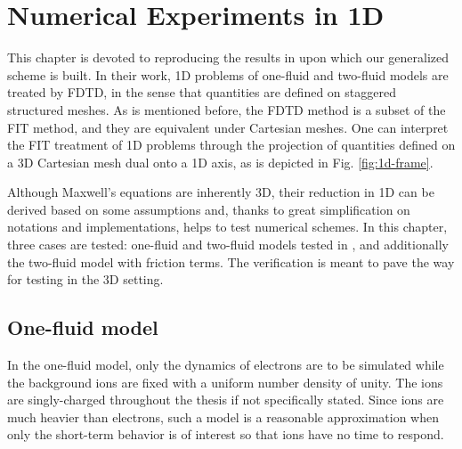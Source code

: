\documentclass{report}
\begin{document}
\chapter{Numerical Experiments in 1D}
This chapter is devoted to reproducing the results in \cite{degond_2012} upon which our generalized scheme is built. In their work, 1D problems of one-fluid and two-fluid models are treated by FDTD, in the sense that quantities are defined on staggered structured meshes. As is mentioned before, the FDTD method is a subset of the FIT method, and they are equivalent under Cartesian meshes. One can interpret the FIT treatment of 1D problems through the projection of quantities defined on a 3D Cartesian mesh dual onto a 1D axis, as is depicted in Fig. \ref{fig:1d-frame}.

Although Maxwell's equations are inherently 3D, their reduction in 1D can be derived based on some assumptions and, thanks to great simplification on notations and implementations, helps to test numerical schemes. In this chapter, three cases are tested: one-fluid and two-fluid models tested in \cite{degond_2012}, and additionally the two-fluid model with friction terms. The verification is meant to pave the way for testing in the 3D setting.    

\section{One-fluid model}
In the one-fluid model, only the dynamics of electrons are to be simulated while the background ions are fixed with a uniform number density of unity. The ions are singly-charged throughout the thesis if not specifically stated. Since ions are much heavier than electrons, such a model is a reasonable approximation when only the short-term behavior is of interest so that ions have no time to respond. 
\end{document}
